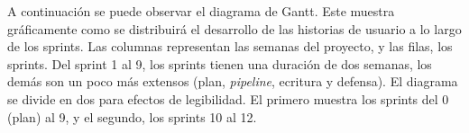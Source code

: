 \documentclass[
11pt, %
]{charter}
\begin{document}











A continuación se puede observar el diagrama de Gantt. Este muestra gráficamente como se distribuirá el desarrollo de las historias de usuario a lo largo de los sprints. Las columnas representan las semanas del proyecto, y las filas, los sprints. Del sprint 1 al 9, los sprints tienen una duración de dos semanas, los demás son un poco más extensos (plan, \textit{pipeline}, ecritura y defensa).
El diagrama se divide en dos para efectos de legibilidad. El primero muestra los sprints del 0 (plan) al 9, y el segundo, los sprints 10 al 12.
\end{document}
